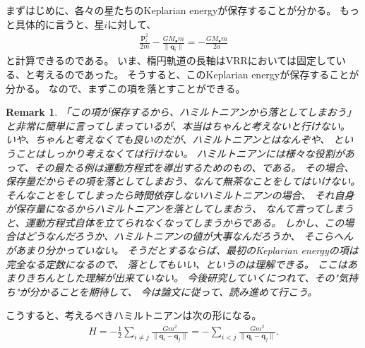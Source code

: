\documentclass[10pt, pre, twocolumn, showpacs, aps]{revtex4-1}
\newtheorem{remark}{Remark}
\begin{document}
まずはじめに、各々の星たちのKeplarian energyが保存することが分かる。
もっと具体的に言うと、星$i$に対して、
\begin{align}
\frac{\pmb{p}_{i}^{2}}{2m}-\frac{GM_{\bullet}m}{\|\pmb{q}_{i}\|}=-\frac{GM_{\bullet}m}{2a}
\end{align}
と計算できるのである。
いま、楕円軌道の長軸はVRRにおいては固定している、と考えるのであった。
そうすると、このKeplarian energyが保存することが分かる。
なので、まずこの項を落とすことができる。
\begin{remark}
「この項が保存するから、ハミルトニアンから落としてしまおう」
と非常に簡単に言ってしまっているが、本当はちゃんと考えないと行けない。
いや、ちゃんと考えなくても良いのだが、ハミルトニアンとはなんぞや、
ということはしっかり考えなくては行けない。
ハミルトニアンには様々な役割があって、その最たる例は運動方程式を導出するためのもの、である。
その場合、保存量だからその項を落としてしまおう、なんて無茶なことをしてはいけない。
そんなことをしてしまったら時間依存しないハミルトニアンの場合、
それ自身が保存量になるからハミルトニアンを落としてしまおう、
なんて言ってしまうと、運動方程式自体を立てられなくなってしまうからである。
しかし、この場合はどうなんだろうか、ハミルトニアンの値が大事なんだろうか、
そこらへんがあまり分かっていない。
そうだとするならば、最初のKeplarian energyの項は完全なる定数になるので、
落としてもいい、というのは理解できる。
ここはあまりきちんとした理解が出来ていない。
今後研究していくにつれて、その"気持ち"が分かることを期待して、
今は論文に従って、読み進めて行こう。
\end{remark}

こうすると、考えるべきハミルトニアンは次の形になる。
\begin{align}
H=-\frac{1}{2}\sum_{i\ne j}\frac{Gm^{2}}{\|\pmb{q}_{i}-\pmb{q}_{j}\|}
=-\sum_{i<j}\frac{Gm^{2}}{\|\pmb{q}_{i}-\pmb{q}_{j}\|}.
\end{align}
\end{document}
